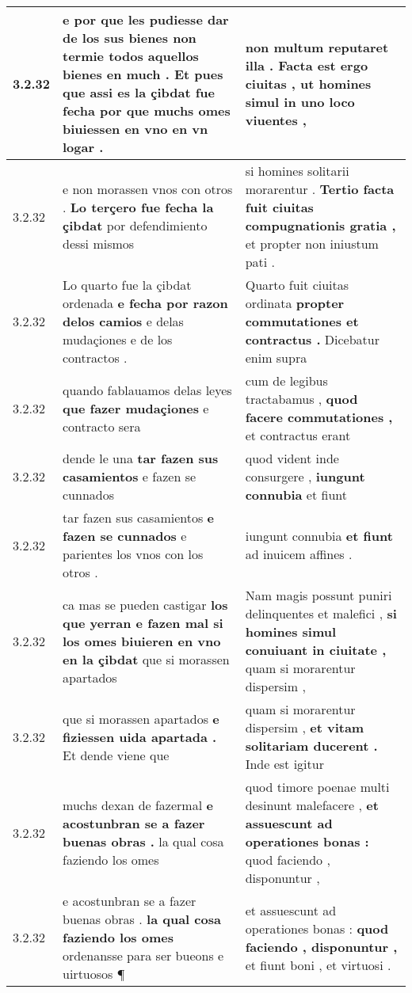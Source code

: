 \begin{tabular}{|p{1cm}|p{6.5cm}|p{6.5cm}|}
3.2.32 & e por que les pudiesse dar de los sus bienes non termie todos aquellos bienes en much . \textbf{ Et pues que assi es la çibdat fue fecha } por que muchs omes biuiessen en vno en vn logar . & non multum reputaret illa . \textbf{ Facta est ergo ciuitas , } ut homines simul in uno loco viuentes , \\\hline
3.2.32 & e non morassen vnos con otros . \textbf{ Lo terçero fue fecha la çibdat } por defendimiento dessi mismos & si homines solitarii morarentur . \textbf{ Tertio facta fuit ciuitas compugnationis gratia , } et propter non iniustum pati . \\\hline
3.2.32 & Lo quarto fue la çibdat ordenada \textbf{ e fecha por razon delos camios } e delas mudaçiones e de los contractos . & Quarto fuit ciuitas ordinata \textbf{ propter commutationes et contractus . } Dicebatur enim supra \\\hline
3.2.32 & quando fablauamos delas leyes \textbf{ que fazer mudaçiones } e contracto sera & cum de legibus tractabamus , \textbf{ quod facere commutationes , } et contractus erant \\\hline
3.2.32 & dende le una \textbf{ tar fazen sus casamientos } e fazen se cunnados & quod vident inde consurgere , \textbf{ iungunt connubia } et fiunt \\\hline
3.2.32 & tar fazen sus casamientos \textbf{ e fazen se cunnados } e parientes los vnos con los otros . & iungunt connubia \textbf{ et fiunt } ad inuicem affines . \\\hline
3.2.32 & ca mas se pueden castigar \textbf{ los que yerran e fazen mal si los omes biuieren en vno en la çibdat } que si morassen apartados & Nam magis possunt puniri delinquentes et malefici , \textbf{ si homines simul conuiuant in ciuitate , } quam si morarentur dispersim , \\\hline
3.2.32 & que si morassen apartados \textbf{ e fiziessen uida apartada . } Et dende viene que & quam si morarentur dispersim , \textbf{ et vitam solitariam ducerent . } Inde est igitur \\\hline
3.2.32 & muchs dexan de fazermal \textbf{ e acostunbran se a fazer buenas obras . } la qual cosa faziendo los omes & quod timore poenae multi desinunt malefacere , \textbf{ et assuescunt ad operationes bonas : } quod faciendo , disponuntur , \\\hline
3.2.32 & e acostunbran se a fazer buenas obras . \textbf{ la qual cosa faziendo los omes } ordenansse para ser bueons e uirtuosos ¶ & et assuescunt ad operationes bonas : \textbf{ quod faciendo , disponuntur , } et fiunt boni , et virtuosi . \\\hline

\end{tabular}
